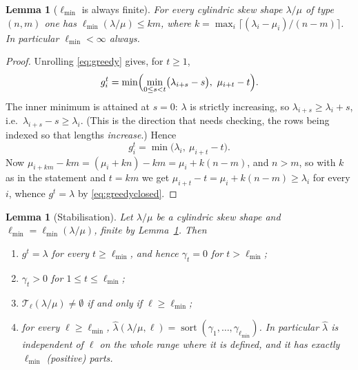 \documentclass[11pt]{article}
\theoremstyle{plain}
\newtheorem{lem}[thm]{Lemma}
\theoremstyle{definition}
\DeclareMathOperator{\sort}{sort}
\begin{document}
\begin{lem}[$\ell_{\min}$ is always finite]\label{lem:lminfinite}
For every cylindric skew shape $\lambda/\mu$ of type $(n,m)$ one has
$\ell_{\min}(\lambda/\mu)\le km$, where $k=\max_i\lceil(\lambda_i-\mu_i)/(n-m)\rceil$. In
particular $\ell_{\min}<\infty$ always.
\end{lem}

\begin{proof}
Unrolling \eqref{eq:greedy} gives, for $t\ge1$,
\[
  g^{t}_i=\min\Bigl(\min_{0\le s<t}\bigl(\lambda_{i+s}-s\bigr),\ \mu_{i+t}-t\Bigr).
\]
The inner minimum is attained at $s=0$: $\lambda$ is strictly increasing, so
$\lambda_{i+s}\ge\lambda_i+s$, i.e.\ $\lambda_{i+s}-s\ge\lambda_i$. (This is the direction that
needs checking, the rows being indexed so that lengths \emph{increase}.) Hence
\begin{equation}\label{eq:greedyclosed}
  g^{t}_i=\min\bigl(\lambda_i,\ \mu_{i+t}-t\bigr).
\end{equation}
Now $\mu_{i+km}-km=(\mu_i+kn)-km=\mu_i+k(n-m)$, and $n>m$, so with $k$ as in the statement and
$t=km$ we get $\mu_{i+t}-t=\mu_i+k(n-m)\ge\lambda_i$ for every $i$, whence $g^{t}=\lambda$ by
\eqref{eq:greedyclosed}.
\end{proof}

\begin{lem}[Stabilisation]\label{lem:stab}
Let $\lambda/\mu$ be a cylindric skew shape and $\ell_{\min}=\ell_{\min}(\lambda/\mu)$, finite by
Lemma~\ref{lem:lminfinite}. Then
\begin{enumerate}
\item $g^{t}=\lambda$ for every $t\ge\ell_{\min}$, and hence $\gamma_t=0$ for $t>\ell_{\min}$;
\item $\gamma_t>0$ for $1\le t\le\ell_{\min}$;
\item $\mathcal T_\ell(\lambda/\mu)\ne\emptyset$ if and only if $\ell\ge\ell_{\min}$;
\item for every $\ell\ge\ell_{\min}$,
$\hat\lambda(\lambda/\mu,\ell)=\sort(\gamma_1,\dots,\gamma_{\ell_{\min}})$. In particular
$\hat\lambda$ is independent of $\ell$ on the whole range where it is defined, and it has
exactly $\ell_{\min}$ (positive) parts.
\end{enumerate}
\end{lem}
\end{document}
